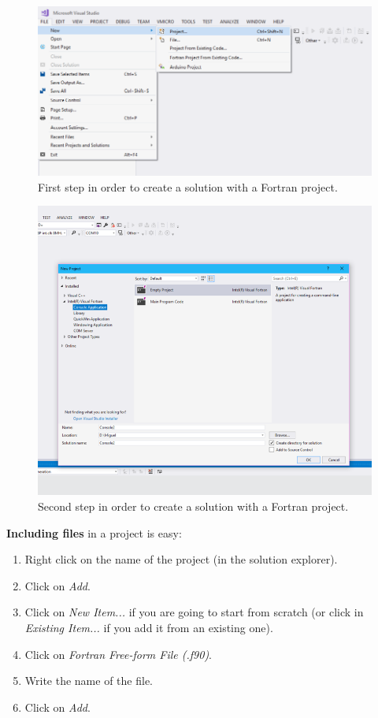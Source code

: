 \begin{figure}[h]
    \centering
    \includegraphics[width=\textwidth]{Figures/Pro1}
    \caption{First step in order to create a solution with a Fortran project.}
    \label{fig:Pro1}
\end{figure}

\begin{figure}[h]
    \centering
    \includegraphics[width= \textwidth]{Figures/Pro2}
    \caption{Second step in order to create a solution with a Fortran project.}
    \label{fig:Pro2}
\end{figure}

\label{Including}\textbf{Including files} in a project is easy:
\begin{enumerate}[nosep]
    \item Right click on the name of the project (in the solution explorer).
    \item Click on \textit{Add}.
    \item Click on \textit{New Item...} if you are going to start from scratch (or click in \textit{Existing Item...} if you add it from an existing one).
    \item Click on \textit{Fortran Free-form File (.f90)}.
    \item Write the name of the file.
    \item Click on \textit{Add}.
\end{enumerate}

